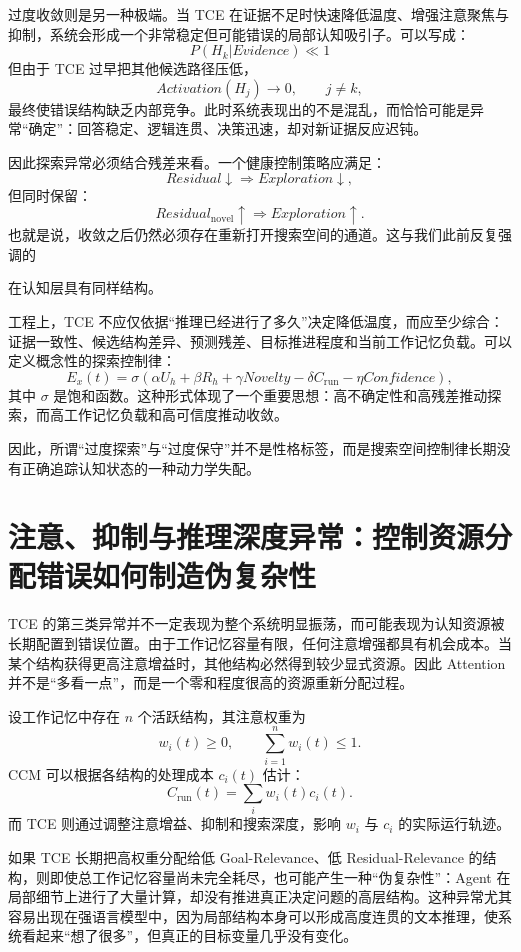 过度收敛则是另一种极端。当 TCE 在证据不足时快速降低温度、增强注意聚焦与抑制，系统会形成一个非常稳定但可能错误的局部认知吸引子。可以写成：
\[
P(H_k|Evidence)
\ll 1
\]
但由于 TCE 过早把其他候选路径压低，
\[
Activation(H_j)\rightarrow 0,\qquad j\neq k,
\]
最终使错误结构缺乏内部竞争。此时系统表现出的不是混乱，而恰恰可能是异常“确定”：回答稳定、逻辑连贯、决策迅速，却对新证据反应迟钝。

因此探索异常必须结合残差来看。一个健康控制策略应满足：
\[
Residual\downarrow
\Rightarrow
Exploration\downarrow,
\]
但同时保留：
\[
Residual_{\mathrm{novel}}\uparrow
\Rightarrow
Exploration\uparrow.
\]
也就是说，收敛之后仍然必须存在重新打开搜索空间的通道。这与我们此前反复强调的
\begin{statementbox}
\centering
{}
\end{statementbox}
在认知层具有同样结构。

工程上，TCE 不应仅依据“推理已经进行了多久”决定降低温度，而应至少综合：证据一致性、候选结构差异、预测残差、目标推进程度和当前工作记忆负载。可以定义概念性的探索控制律：
\[
E_x(t)
=
\sigma
\left(
\alpha U_h
+
\beta R_h
+
\gamma Novelty
-
\delta C_{\mathrm{run}}
-
\eta Confidence
\right),
\]
其中 \(\sigma\) 是饱和函数。这种形式体现了一个重要思想：高不确定性和高残差推动探索，而高工作记忆负载和高可信度推动收敛。

因此，所谓“过度探索”与“过度保守”并不是性格标签，而是搜索空间控制律长期没有正确追踪认知状态的一种动力学失配。

\section{注意、抑制与推理深度异常：控制资源分配错误如何制造伪复杂性}

TCE 的第三类异常并不一定表现为整个系统明显振荡，而可能表现为认知资源被长期配置到错误位置。由于工作记忆容量有限，任何注意增强都具有机会成本。当某个结构获得更高注意增益时，其他结构必然得到较少显式资源。因此 Attention 并不是“多看一点”，而是一个零和程度很高的资源重新分配过程。

设工作记忆中存在 \(n\) 个活跃结构，其注意权重为
\[
w_i(t)\geq 0,
\qquad
\sum_{i=1}^{n}w_i(t)\leq 1.
\]
CCM 可以根据各结构的处理成本 \(c_i(t)\) 估计：
\[
C_{\mathrm{run}}(t)
=
\sum_i w_i(t)c_i(t).
\]
而 TCE 则通过调整注意增益、抑制和搜索深度，影响 \(w_i\) 与 \(c_i\) 的实际运行轨迹。

如果 TCE 长期把高权重分配给低 Goal-Relevance、低 Residual-Relevance 的结构，则即使总工作记忆容量尚未完全耗尽，也可能产生一种“伪复杂性”：Agent 在局部细节上进行了大量计算，却没有推进真正决定问题的高层结构。这种异常尤其容易出现在强语言模型中，因为局部结构本身可以形成高度连贯的文本推理，使系统看起来“想了很多”，但真正的目标变量几乎没有变化。


